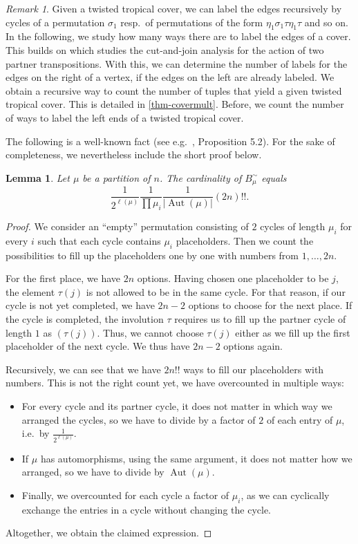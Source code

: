 \documentclass[10pt]{amsart}
\theoremstyle{plain}
\theoremstyle{definition}
\theoremstyle{definition}
\theoremstyle{plain}
\newtheorem{lemma}[lemma]{Lemma}
\theoremstyle{plain}
\theoremstyle{remark}
\newtheorem{rema}[rema]{Remark}
\theoremstyle{plain}
\theoremstyle{plain}
\DeclareMathOperator{\Aut}{Aut}
\begin{document}
\begin{rema}
    Given a twisted tropical cover, we can label the edges recursively by cycles of a permutation $\sigma_1$ resp.\ of permutations of the form $\eta_1\sigma_1\tau\eta_1\tau$ and so on. In the following, we study how many ways there are to label the edges of a cover. This builds on \cite[Theorem 2.12]{BF21} which studies the cut-and-join analysis for the action of two partner transpositions. With this, we can determine the number of labels for the edges on the right of a vertex, if the edges on the left are already labeled. We obtain a recursive way to count the number of tuples that yield a given twisted tropical cover. This is detailed in \cref{thm-covermult}. Before, we count the number of ways to label the left ends of a twisted tropical cover.
\end{rema}

The following is a well-known fact (see e.g.~\cite{goulden1996connection}, Proposition 5.2). For the sake of completeness, we nevertheless include the short proof below.
\begin{lemma}
\label{lem-conjclass}
Let $\mu$ be a partition of $n$.
The cardinality of $B^\sim_\mu$ equals
$$ \frac{1}{2^{\ell(\mu)}} \frac{1}{\prod \mu_i} \frac{1}{|\Aut(\mu)|}(2n)!! .$$
\end{lemma}

\begin{proof}
We consider an ``empty'' permutation consisting of $2$ cycles of length $\mu_i$ for every $i$ such that each cycle contains $\mu_i$ placeholders. Then we count the possibilities to fill up the placeholders one by one with numbers from $1,\ldots,2n$.

For the first place, we have $2n$ options. 
Having chosen one placeholder to be $j$, the element $\tau(j)$ is not allowed to be in the same cycle. For that reason, if our cycle is not yet completed, we have $2n-2$ options to choose for the next place. If the cycle is completed, the involution $\tau$ requires us to fill up the partner cycle of length $1$ as $(\tau(j))$. Thus, we cannot choose $\tau(j)$ either as we fill up the first placeholder of the next cycle. We thus have $2n-2$ options again.

Recursively, we can see that we have $2n!!$ ways to fill our placeholders with numbers. This is not the right count yet, we have overcounted in multiple ways:
\begin{itemize}
    \item For every cycle and its partner cycle, it does not matter in which way we arranged the cycles, so we have to divide by a factor of $2$ of each entry of $\mu$, i.e.\ by $\frac{1}{2^{\ell(\mu)}}$.
    \item If $\mu$ has automorphisms, using the same argument, it does not matter how we arranged, so we have to divide by $\Aut(\mu)$.
    \item Finally, we overcounted for each cycle a factor of $\mu_i$, as we can cyclically exchange the entries in a cycle without changing the cycle.
\end{itemize}
Altogether, we obtain the claimed expression.
\end{proof}
\end{document}

